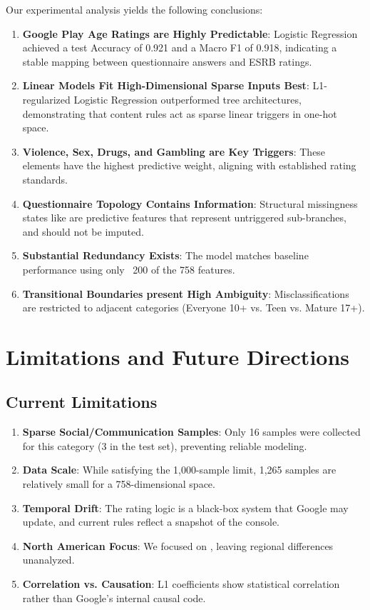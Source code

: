 \documentclass[11pt,a4paper]{article}
\newcommand{\code}[1]{\texttt{\footnotesize\detokenize{#1}}}
\begin{document}
Our experimental analysis yields the following conclusions:
\begin{enumerate}[leftmargin=2em]
  \item \textbf{Google Play Age Ratings are Highly Predictable}: Logistic Regression achieved a test Accuracy of 0.921 and a Macro F1 of 0.918, indicating a stable mapping between questionnaire answers and ESRB ratings.
  \item \textbf{Linear Models Fit High-Dimensional Sparse Inputs Best}: L1-regularized Logistic Regression outperformed tree architectures, demonstrating that content rules act as sparse linear triggers in one-hot space.
  \item \textbf{Violence, Sex, Drugs, and Gambling are Key Triggers}: These elements have the highest predictive weight, aligning with established rating standards.
  \item \textbf{Questionnaire Topology Contains Information}: Structural missingness states like \code{__INACTIVE__} are predictive features that represent untriggered sub-branches, and should not be imputed.
  \item \textbf{Substantial Redundancy Exists}: The model matches baseline performance using only ~200 of the 758 features.
  \item \textbf{Transitional Boundaries present High Ambiguity}: Misclassifications are restricted to adjacent categories (Everyone 10+ vs. Teen vs. Mature 17+).
\end{enumerate}

\section{Limitations and Future Directions}

\subsection{Current Limitations}

\begin{enumerate}[leftmargin=2em]
  \item \textbf{Sparse Social/Communication Samples}: Only 16 samples were collected for this category (3 in the test set), preventing reliable modeling.
  \item \textbf{Data Scale}: While satisfying the 1,000-sample limit, 1,265 samples are relatively small for a 758-dimensional space.
  \item \textbf{Temporal Drift}: The rating logic is a black-box system that Google may update, and current rules reflect a snapshot of the console.
  \item \textbf{North American Focus}: We focused on \code{rating__north_america}, leaving regional differences unanalyzed.
  \item \textbf{Correlation vs. Causation}: L1 coefficients show statistical correlation rather than Google's internal causal code.
\end{enumerate}
\end{document}
